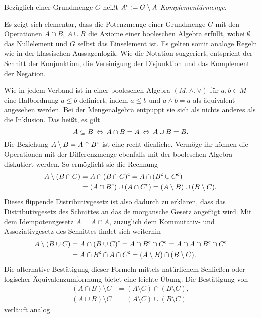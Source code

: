 \begin{Definition}[Komplement]\newlinefirst
Bezüglich einer Grundmenge $G$ heißt $A^\mathsf c := G\setminus A$
\emph{Komplementärmenge}.
\end{Definition}
Es zeigt sich elementar, dass die Potenzmenge einer Grundmenge $G$
mit den Operationen $A\cap B$, $A\cup B$ die Axiome
einer booleschen Algebra erfüllt, wobei
$\emptyset$ das Nullelement und $G$ selbst das Einselement ist. Es
gelten somit analoge Regeln wie in der klassischen Aussagenlogik. Wie
die Notation suggeriert, entspricht der Schnitt der Konjunktion, die
Vereinigung der Disjunktion und das Komplement der Negation.

Wie in jedem Verband ist in einer booleschen Algebra
$(M,\wedge,\vee)$ für $a,b\in M$ eine Halbordnung $a\le b$
definiert, indem $a\le b$ und $a\wedge b = a$ als äquivalent
angesehen werden. Bei der Mengenalgebra entpuppt sie sich
als nichts anderes als die Inklusion. Das heißt, es gilt%
\[A\subseteq B\,\Leftrightarrow\, A\cap B = A\,\Leftrightarrow\, A\cup B = B.\]
Die Beziehung $A\setminus B = A\cap B^\mathsf c$ ist eine recht dienliche.
Vermöge ihr können die Operationen mit der Differenzmenge ebenfalls mit
der booleschen Algebra diskutiert werden. So ermöglicht sie
die Rechnung
\begin{align*}
A\setminus (B\cap C) &= A\cap (B\cap C)^\mathsf c
= A\cap (B^\mathsf c\cup C^\mathsf c)\\
&= (A\cap B^\mathsf c)\cup (A\cap C^\mathsf c)
= (A\setminus B)\cup (B\setminus C).
\end{align*}
Dieses flippende Distributivgesetz ist also dadurch zu erklären,
dass das Distributivgesetz des Schnittes an das de morgansche Gesetz
angefügt wird. Mit dem Idempotenzgesetz $A=A\cap A$, zuzüglich
dem Kommutativ- und Assoziativgesetz des Schnittes findet sich weiterhin
\begin{align*}
A\setminus (B\cup C) &= A\cap (B\cup C)^\mathsf c
= A\cap B^\mathsf c\cap C^\mathsf c = A\cap A\cap B^\mathsf c\cap C^\mathsf c\\
&= A\cap B^\mathsf c\cap A\cap C^\mathsf c
= (A\setminus B)\cap (B\setminus C).
\end{align*}
Die alternative Bestätigung dieser Formeln mittels natürlichem Schließen
oder logischer Äquivalenzumformung bietet eine leichte Übung.
Die Bestätigung von
\begin{align*}
(A\cap B)\setminus C &= (A\setminus C)\cap (B\setminus C),\\
(A\cup B)\setminus C &= (A\setminus C)\cup (B\setminus C)
\end{align*}
verläuft analog.

